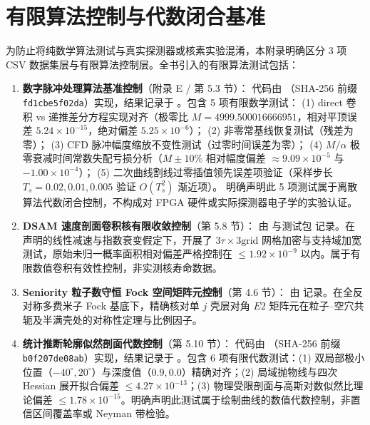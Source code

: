 \section{有限算法控制与代数闭合基准}\label{sec:appF-finite-controls}

为防止将纯数学算法测试与真实探测器或核素实验混淆，本附录明确区分 3 项 CSV 数据集层与有限算法控制层。全书引入的有限算法测试包括：
\begin{enumerate}[label=(\arabic*),leftmargin=2em]
    \item \textbf{数字脉冲处理算法基准控制}（附录 E / 第 5.3 节）：
    代码由 （SHA-256 前缀 \texttt{fd1cbe5f02da}）实现，结果记录于 。包含 5 项有限数学测试：
    (1) direct 卷积 vs 递推差分方程实现对齐（极零比 $M=4999.500016666951$，相对平顶误差 $5.24 \times 10^{-15}$，绝对偏差 $5.25 \times 10^{-6}$）；
    (2) 非零常基线恢复测试（残差为零）；
    (3) CFD 脉冲幅度缩放不变性测试（过零时间误差为零）；
    (4) $M/\alpha$ 极零衰减时间常数失配亏损分析（$M \pm 10\%$ 相对幅度偏差 $\approx 9.09 \times 10^{-5}$ 与 $-1.00 \times 10^{-4}$）；
    (5) 二次曲线割线过零插值领先误差项验证（采样步长 $T_s = 0.02, 0.01, 0.005$ 验证 $O(T_s^2)$ 渐近项）。
    明确声明此 5 项测试属于离散算法代数闭合控制，不构成对 FPGA 硬件或实际探测器电子学的实验认证。
    \vspace{1ex}
    \item \textbf{DSAM 速度剖面卷积核有限收敛控制}（第 5.8 节）：
    由  与测试包  记录。在声明的线性减速与指数衰变假定下，开展了 $3\tau \times 3\text{grid}$ 网格加密与支持域加宽测试，原始未归一概率面积相对偏差严格控制在 $\le 1.92 \times 10^{-9}$ 以内。属于有限数值卷积有效性控制，非实测核寿命数据。
    \vspace{1ex}
    \item \textbf{Seniority 粒子数守恒 Fock 空间矩阵元控制}（第 4.6 节）：
    由  记录。在全反对称多费米子 Fock 基底下，精确核对单 $j$ 壳层对角 $E2$ 矩阵元在粒子--空穴共轭及半满壳处的对称性定理与比例因子。
    \vspace{1ex}
    \item \textbf{统计推断轮廓似然剖面代数控制}（第 5.10 节）：
    代码由 （SHA-256 前缀 \texttt{b0f207de08ab}）实现，结果记录于 。包含 6 项有限代数测试：(1) 双局部极小位置（$-40^\circ, 20^\circ$）与深度值（$0.9, 0.0$）精确对齐；(2) 局域抛物线与四次 Hessian 展开拟合偏差 $\le 4.27 \times 10^{-13}$；(3) 物理受限剖面与高斯对数似然比理论偏差 $\le 1.78 \times 10^{-15}$。明确声明此测试属于绘制曲线的数值代数控制，非置信区间覆盖率或 Neyman 带检验。

\end{enumerate}
